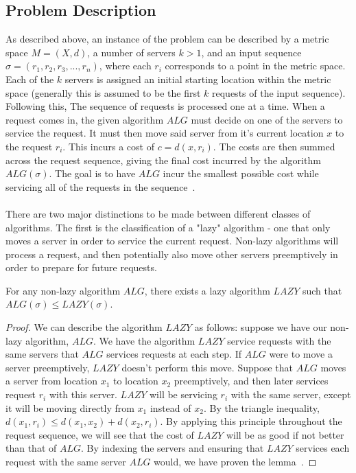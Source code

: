 \subsection{Problem Description}
\label{sec:desc}
As described above, an instance of the \KS problem can be described by a metric space $M = (X, d)$, a number of servers $k>1$, and an input sequence $\sigma = (r_1, r_2, r_3, ..., r_n)$, where each $r_i$ corresponds to a point in the metric space. Each of the $k$ servers is assigned an initial starting location within the metric space (generally this is assumed to be the first $k$ requests of the input sequence). Following this, The sequence of requests is processed one at a time. When a request comes in, the given algorithm $ALG$ must decide on one of the servers to service the request. It must then move said server from it's current location $x$ to the request $r_i$. This incurs a cost of $c = d(x, r_i)$. The costs are then summed across the request sequence, giving the final cost incurred by the algorithm $ALG(\sigma)$. The goal is to have $ALG$ incur the smallest possible cost while servicing all of the requests in the sequence~\cite{OnlineComp1998}.
\\ \\
There are two major distinctions to be made between different classes of algorithms. The first is the classification of a "lazy" algorithm - one that only moves a server in order to service the current request. Non-lazy algorithms will process a request, and then potentially also move other servers preemptively in order to prepare for future requests. 

\begin{lemma}
    For any non-lazy algorithm $ALG$, there exists a lazy algorithm $LAZY$ such that $ALG(\sigma) \leq LAZY(\sigma)$.
\end{lemma}

\begin{proof}
    We can describe the algorithm $LAZY$ as follows: suppose we have our non-lazy algorithm, $ALG$. We have the algorithm $LAZY$ service requests with the same servers that $ALG$ services requests at each step. If $ALG$ were to move a server preemptively, $LAZY$ doesn't perform this move. Suppose that $ALG$ moves a server from location $x_1$ to location $x_2$ preemptively, and then later services request $r_i$ with this server. $LAZY$ will be servicing $r_i$ with the same server, except it will be moving directly from $x_1$ instead of $x_2$. By the triangle inequality, $d(x_1, r_i) \leq d(x_1, x_2) + d(x_2, r_i)$. By applying this principle throughout the request sequence, we will see that the cost of $LAZY$ will be as good if not better than that of $ALG$. By indexing the servers and ensuring that $LAZY$ services each request with the same server $ALG$ would, we have proven the lemma~\cite{OnlineComp1998}.
\end{proof}

